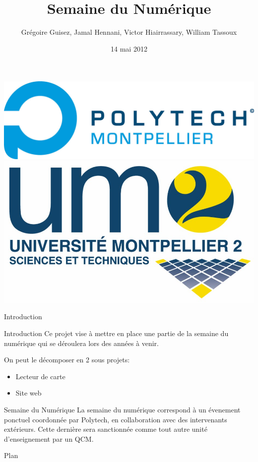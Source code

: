 \documentclass[handout]{beamer}
\title{Semaine du Numérique}
\author[G. Guisez, J. Hennani, V. Hiairrassary, W. Tassoux]{Grégoire Guisez, Jamal Hennani, Victor Hiairrassary, William Tassoux}
\institute{Polytech' Montpellier, Université Montpellier 2}
\date{14 mai 2012}
\begin{document}
\small 



\begin{frame}
    \titlepage

    \includegraphics[scale=0.2]{images/logoPolytech.jpg}
    \hfill
    \hskip8pt
    \includegraphics[scale=0.05]{images/logoUm2.jpg}
\end{frame}


\begin{frame}{Introduction}
    \begin{block}{Introduction}
 		 Ce projet vise à mettre en place une partie de la semaine du numérique qui se déroulera lors des années à venir.

		 On peut le décomposer en 2 sous projets:
		\begin{itemize}
			\item Lecteur de carte
			\item Site web
		\end{itemize}
	\end{block}

	\begin{block}{Semaine du Numérique}
	    La semaine du numérique correspond à un évenement ponctuel coordonnée 
    par Polytech, en collaboration avec des intervenants extérieurs. Cette 
    dernière sera sanctionnée comme tout autre unité d'enseignement par un QCM.
	\end{block}	
\end{frame}


\begin{frame}{Plan}
 	\tableofcontents
\end{frame}





\end{document}
